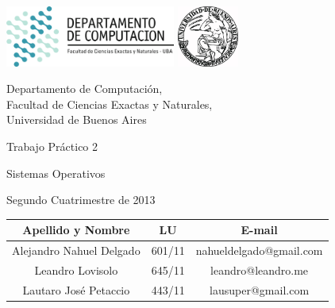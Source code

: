 \documentclass[a4paper,10pt,twoside]{article}
\begin{document}


\thispagestyle{caratula}

\begin{center}

\includegraphics[height=2cm]{DC.png} 
\hfill
\includegraphics[height=2cm]{UBA.jpg} 

\vspace{2cm}

Departamento de Computación,\\
Facultad de Ciencias Exactas y Naturales,\\
Universidad de Buenos Aires

\vspace{4cm}

\begin{Huge}
Trabajo Práctico 2
\end{Huge}

\vspace{0.5cm}

\begin{Large}
Sistemas Operativos
\end{Large}

\vspace{1cm}

Segundo Cuatrimestre de 2013

\vspace{4cm}

\begin{tabular}{|c|c|c|}
\hline
Apellido y Nombre & LU & E-mail\\
\hline
Alejandro Nahuel Delgado & 601/11 & nahueldelgado@gmail.com\\
Leandro Lovisolo         & 645/11 & leandro@leandro.me\\
Lautaro José Petaccio    & 443/11 & lausuper@gmail.com\\
\hline
\end{tabular}

\end{center}
\end{document}
